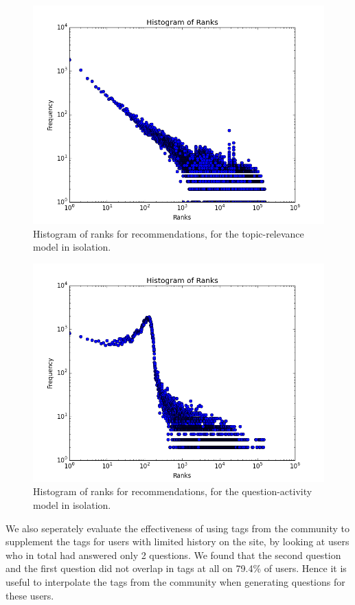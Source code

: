 \documentclass[a4paper]{article}
\begin{document}
\begin{figure}
\centering
\includegraphics[width=\columnwidth]{results-1}
\caption{Histogram of ranks for recommendations, for the topic-relevance model in isolation.}
\label{fig:results-1}
\end{figure}

\begin{figure}
\centering
\includegraphics[width=\columnwidth]{results-2}
\caption{Histogram of ranks for recommendations, for the question-activity model in isolation.}
\label{fig:results-2}
\end{figure}

We also seperately evaluate the effectiveness of using tags from the community to supplement the tags for users with limited history on the site, by looking at users who in total had answered only 2 questions. We found that the second question and the first question did not overlap in tags at all on 79.4\% of users. Hence it is useful to interpolate the tags from the community when generating questions for these users.
\end{document}
